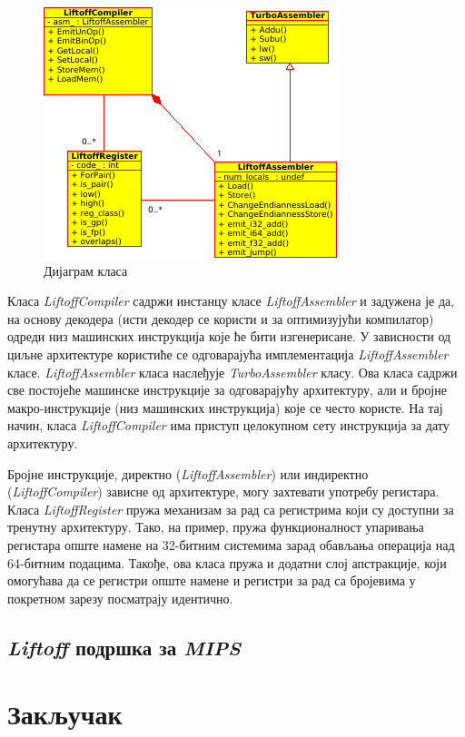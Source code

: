 \documentclass[12pt,oneside]{memoir}
\begin{document}
\begin{figure}
\begin{center}
\includegraphics[scale=0.8]{class_diagram}
\caption{Дијаграм класа}
\label{img:LiftoffDiag}
\end{center}
\end{figure}

Класа \textit{LiftoffCompiler} садржи инстанцу класе \textit{LiftoffAssembler} и задужена је да, на основу декодера (исти декодер се користи и за оптимизујући компилатор) одреди низ машинских инструкција
које ће бити изгенерисане. У зависности од циљне архитектуре користиће се одговарајућа имплементација \textit{LiftoffAssembler} класе. \textit{LiftoffAssembler} класа наслеђује \textit{TurboAssembler} класу.
Ова класа садржи све постојеће машинске инструкције за одговарајућу архитектуру, али и бројне макро-инструкције (низ машинских инструкција) које се често користе. На тај начин, класа \textit{LiftoffCompiler}
има приступ целокупном сету инструкција за дату архитектуру.

Бројне инструкције, директно (\textit{LiftoffAssembler}) или индиректно (\textit{LiftoffCompiler}) зависне од архитектуре, могу захтевати употребу регистара. Класа \textit{LiftoffRegister} пружа механизам за рад са регистрима који су доступни за тренутну архитектуру.
Тако, на пример, пружа функционалност упаривања регистара опште намене на 32-битним системима зарад обављања операција над 64-битним подацима. Такође, ова класа пружа и додатни слој апстракције, који омогућава
да се регистри опште намене и регистри за рад са бројевима у покретном зарезу посматрају идентично.

\section{\textit{Liftoff} подршка за \textit{MIPS}} \label{chp:LIFTOFFMIPS}

\chapter{Закључак}

\literatura

\backmatter
\end{document}
